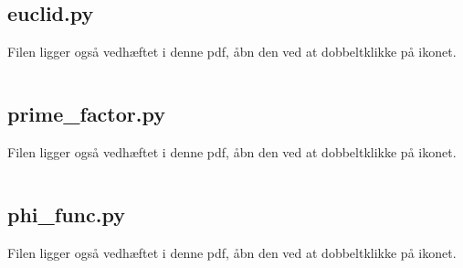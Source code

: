 \subsection{euclid.py}
\label{file:euclid}
Filen ligger også vedhæftet i denne pdf, åbn den ved at dobbeltklikke på ikonet.
\inputminted[python3, linenos, breaklines, frame=lines, fontsize=\footnotesize]{python}{src/euclid.py}


\newpage
\subsection{prime\_factor.py}
\label{file:prime_factor}
Filen ligger også vedhæftet i denne pdf, åbn den ved at dobbeltklikke på ikonet.
\inputminted[python3, linenos, breaklines, frame=lines, fontsize=\footnotesize]{python}{src/prime_factor.py}


\newpage
\subsection{phi\_func.py}
\label{file:phi_func}
Filen ligger også vedhæftet i denne pdf, åbn den ved at dobbeltklikke på ikonet.
\inputminted[python3, linenos, breaklines, frame=lines, fontsize=\footnotesize]{python}{src/phi_func.py}
